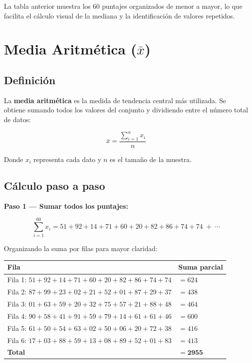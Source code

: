 \documentclass[12pt,a4paper]{article}
\begin{document}
\bigskip
La tabla anterior muestra los 60 puntajes organizados de menor a mayor, lo que facilita el cálculo visual de la mediana y la identificación de valores repetidos.

\section{Media Aritmética (\(\bar{x}\))}

\subsection{Definición}

La \textbf{media aritmética} es la medida de tendencia central más utilizada. Se obtiene sumando todos los valores del conjunto y dividiendo entre el número total de datos:

\begin{equation}
  \bar{x} = \frac{\displaystyle\sum_{i=1}^{n} x_i}{n}
\end{equation}

Donde $x_i$ representa cada dato y $n$ es el tamaño de la muestra.

\subsection{Cálculo paso a paso}

\textbf{Paso 1 — Sumar todos los puntajes:}

\[
\sum_{i=1}^{60} x_i = 51{+}92{+}14{+}71{+}60{+}20{+}82{+}86{+}74{+}74 \;+\; \cdots
\]

Organizando la suma por filas para mayor claridad:

\begin{center}
\begin{tabular}{ll}
\toprule
\textbf{Fila} & \textbf{Suma parcial} \\
\midrule
Fila 1: $51+92+14+71+60+20+82+86+74+74$ & $= 624$ \\
Fila 2: $87+99+23+02+21+52+01+87+29+37$ & $= 438$ \\
Fila 3: $01+63+59+20+32+75+57+21+88+48$ & $= 464$ \\
Fila 4: $90+58+41+91+59+79+14+61+61+46$ & $= 600$ \\
Fila 5: $61+50+54+63+02+50+06+20+72+38$ & $= 416$ \\
Fila 6: $17+03+88+59+13+08+89+52+01+83$ & $= 413$ \\
\midrule
\textbf{Total} & $\mathbf{= 2955}$ \\
\bottomrule
\end{tabular}
\end{center}
\end{document}
